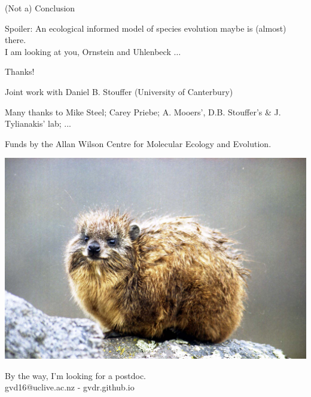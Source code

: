 \documentclass[]{beamer}
\begin{document}
\begin{frame}{(Not a) Conclusion}

  Spoiler: An ecological informed model of species evolution maybe
  is (almost) there.\\
  {\small I am looking at you, Ornstein and Uhlenbeck $\dots$}

\end{frame}

\begin{frame}{Thanks!}

\begin{centering}
\small{
Joint work with  
Daniel B. Stouffer (University of Canterbury)

Many thanks to  
Mike Steel; Carey Priebe; A. Mooers', D.B. Stouffer's \& J. Tylianakis' lab; ...

Funds by the Allan Wilson Centre for Molecular Ecology and Evolution.}

\centering
  \includegraphics[width=0.4\linewidth]{images/hyrax.jpg}

\small{By the way, I'm looking for a postdoc.\\ gvd16@uclive.ac.nz - gvdr.github.io}

\end{centering}

\end{frame}
\end{document}
